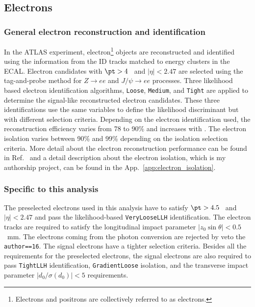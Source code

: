 
\subsection{Electrons}
\label{subsec:event_electrons}


\subsubsection{General electron reconstruction and identification}
\label{subsubsec:event_electrons_general}
In the ATLAS experiment, electron\footnote{Electrons and positrons are collectively referred to as electrons.} objects are reconstructed and identified using the information from the ID tracks matched to energy clusters in the ECAL.
Electron candidates with $\pt > 4$~{\GeV} and $|\eta| < 2.47$ are selected using the tag-and-probe method for $Z \to ee$ and $J/\psi \to ee$ processes.
Three likelihood based electron identification algorithms, \texttt{Loose}, \texttt{Medium}, and \texttt{Tight} are applied to determine the signal-like reconstructed electron candidates.
These three identifications use the same variables to define the likelihood discriminant but with different selection criteria.
Depending on the electron identification used, the reconstruction efficiency varies from 78 to 90\% and increases with \met.
The electron isolation varies between 90\% and 99\% depending on the isolation selection criteria.
More detail about the electron reconstruction performance can be found in Ref.~\cite{ATLAS:2016iqc} and a detail description about the electron isolation, which is my authorship project, can be found in the App.~\ref{app:electron_isolation}.


\subsubsection{Specific to this analysis}
\label{subsubsec:event_electrons_specific}
The preselected electrons used in this analysis have to satisfy $\pt > 4.5$~{\GeV} and $|\eta| < 2.47$ and pass the likelihood-based \texttt{VeryLooseLLH} identification.
The electron tracks are required to satisfy the longitudinal impact parameter $|z_{0}\sin\theta| < 0.5$~mm.
The electrons coming from the photon conversion are rejected by veto the \texttt{author==16}.
The signal electrons have a tighter selection criteria.
Besides all the requirements for the preselected electrons, the signal electrons are also required to pass \texttt{TightLLH} identification, \texttt{GradientLoose} isolation, and the transverse impact parameter $|d_{0}/\sigma(d_{0})| < 5$ requirements.

